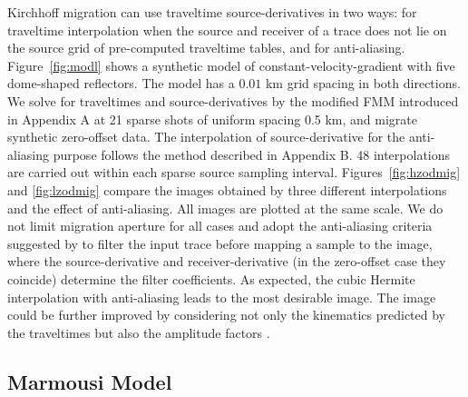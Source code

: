 Kirchhoff migration can use traveltime source-derivatives in two ways: for traveltime interpolation when 
the source and receiver of a trace does not lie on the source grid of pre-computed traveltime tables, 
and for anti-aliasing. Figure~\ref{fig:modl} shows a synthetic model of constant-velocity-gradient with 
five dome-shaped reflectors. The model has a $0.01$ km grid spacing in both directions. We solve for 
traveltimes and source-derivatives by the modified FMM introduced in Appendix A at 21 sparse shots of 
uniform spacing 0.5 km, and migrate synthetic zero-offset data. The interpolation of source-derivative 
for the anti-aliasing purpose follows the method described in Appendix B. 48 interpolations are carried 
out within each sparse source sampling interval. Figures~\ref{fig:hzodmig} and \ref{fig:lzodmig} compare 
the images obtained by three different interpolations and the effect of anti-aliasing. All images are 
plotted at the same scale. We do not limit migration aperture for all cases and adopt the anti-aliasing 
criteria suggested by \cite{abma} to filter the input trace before mapping a sample to the image, where 
the source-derivative and receiver-derivative (in the zero-offset case they coincide) determine the filter 
coefficients. As expected, the cubic Hermite interpolation with anti-aliasing leads to the most desirable 
image. The image could be further improved by considering not only the kinematics predicted by the traveltimes 
but also the amplitude factors \cite[]{dellinger,vanelle2}.


\subsection{Marmousi Model}

